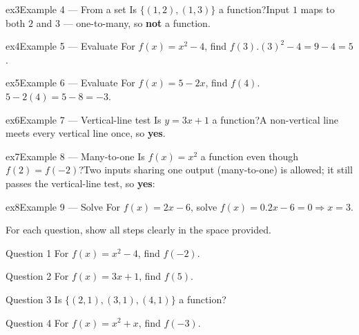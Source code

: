 \documentclass[11pt]{article}
\begin{document}
\begin{example}{ex3}{Example 4 --- From a set}
Is $\{(1,2),(1,3)\}$ a function?\soln Input $1$ maps to both $2$ and $3$ — one-to-many, so \textbf{not} a function.
\end{example}

\begin{example}{ex4}{Example 5 --- Evaluate}
For $f(x)=x^2-4$, find $f(3)$.\soln $(3)^2-4=9-4=5$.
\end{example}

\begin{example}{ex5}{Example 6 --- Evaluate}
For $f(x)=5-2x$, find $f(4)$.\soln $5-2(4)=5-8=-3$.
\end{example}

\begin{example}{ex6}{Example 7 --- Vertical-line test}
Is $y=3x+1$ a function?\soln A non-vertical line meets every vertical line once, so \textbf{yes}.
\end{example}

\begin{example}{ex7}{Example 8 --- Many-to-one}
Is $f(x)=x^2$ a function even though $f(2)=f(-2)$?\soln Two inputs sharing one output (many-to-one) is allowed; it still passes the vertical-line test, so \textbf{yes}:
\end{example}

\begin{example}{ex8}{Example 9 --- Solve}
For $f(x)=2x-6$, solve $f(x)=0$.\soln $2x-6=0\Rightarrow x=3$.
\end{example}

\clearpage
{}
For each question, show all steps clearly in the space provided.

\begin{qbox}{Question 1}
For $f(x)=x^2-4$, find $f(-2)$.\workspace{2.4cm}
\end{qbox}

\begin{qbox}{Question 2}
For $f(x)=3x+1$, find $f(5)$.\workspace{2.4cm}
\end{qbox}

\begin{qbox}{Question 3}
Is $\{(2,1),(3,1),(4,1)\}$ a function?\workspace{2.4cm}
\end{qbox}

\begin{qbox}{Question 4}
For $f(x)=x^2+x$, find $f(-3)$.\workspace{2.4cm}
\end{qbox}
\end{document}
